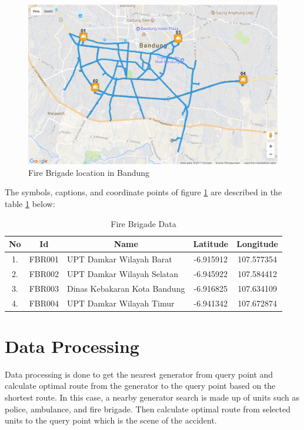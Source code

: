 \begin{figure}[H]
    \centering
    \includegraphics[scale=0.6]{data_coll4.png}
    \caption{Fire Brigade location in Bandung}
    \label{fig:fire_brigade_location}
\end{figure}

The symbols, captions, and coordinate points of figure \ref{fig:fire_brigade_location} are described in the table \ref{table:fire_brigade_data} below:

\begin{table}[H] 
\centering
\begin{tabular}{|c|c|c|c|c|}
\hline
\rowcolor{gray}
\textbf{No} & \textbf{Id} & \textbf{Name} & \textbf{Latitude} & \textbf{Longitude} \\
\hline
1. & FBR001 & \multicolumn{1}{|l|}{UPT Damkar Wilayah Barat} & -6.915912 & 107.577354 \\
\cline{1-5}
2. & FBR002 & \multicolumn{1}{|l|}{UPT Damkar Wilayah Selatan} & -6.945922 & 107.584412  \\
\cline{1-5}
3. & FBR003 & \multicolumn{1}{|l|}{Dinas Kebakaran Kota Bandung} & -6.916825 & 107.634109 \\
\cline{1-5}
4. & FBR004 & \multicolumn{1}{|l|}{UPT Damkar Wilayah Timur} & -6.941342 & 107.672874 \\
\hline
\end{tabular}
\caption{Fire Brigade Data}
\label{table:fire_brigade_data}
\end{table}

\pagebreak

\section{Data Processing}
Data processing is done to get the nearest generator from query point and calculate optimal route from the generator to the query point based on the shortest route. In this case, a nearby generator search is made up of units such as police, ambulance, and fire brigade. Then calculate optimal route from selected units to the query point which is the scene of the accident.

